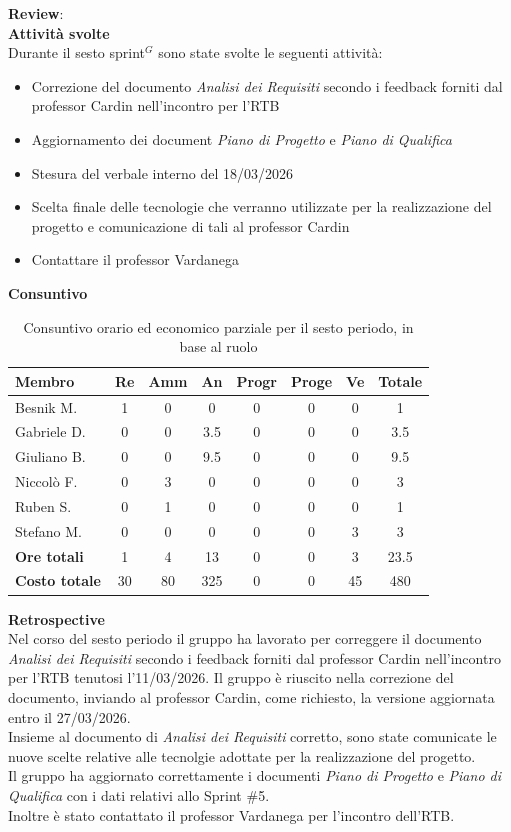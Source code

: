 \documentclass[a4paper,10pt]{article}
\begin{document}
\textbf{Review}: \\
\textbf{Attività svolte}\\
Durante il sesto sprint$^G$ sono state svolte le seguenti attività:
\begin{itemize}
  \item Correzione del documento \textit{Analisi dei Requisiti} secondo i feedback forniti dal professor Cardin nell'incontro per l'RTB
  \item Aggiornamento dei document \textit{Piano di Progetto} e \textit{Piano di Qualifica}
  \item Stesura del verbale interno del 18/03/2026
  \item Scelta finale delle tecnologie che verranno utilizzate per la realizzazione del progetto e comunicazione di tali al professor Cardin
  \item Contattare il professor Vardanega
\end{itemize}
\textbf{Consuntivo}
\begin{table}[H]
\centering
\begin{tabular}{|l|c|c|c|c|c|c|c|}
\hline
\textbf{Membro} & \textbf{Re} & \textbf{Amm} & \textbf{An} & \textbf{Progr} & \textbf{Proge} & \textbf{Ve} & \textbf{Totale} \\
\hline
Besnik M.   & 1   & 0   & 0   & 0   & 0   & 0   & 1   \\
Gabriele D. & 0   & 0 & 3.5   & 0   & 0   & 0   & 3.5 \\
Giuliano B. & 0   & 0   & 9.5   & 0   & 0   & 0 & 9.5 \\
Niccolò F.  & 0   & 3 & 0   & 0   & 0   & 0   & 3   \\
Ruben S.    & 0 & 1   & 0   & 0   & 0   & 0   & 1  \\
Stefano M.  & 0   & 0   & 0   & 0   & 0   & 3   & 3   \\
\hline
\textbf{Ore totali}   & 1 & 4   & 13   & 0  & 0  & 3 & 23.5 \\
\hline
\textbf{Costo totale} & 30  & 80 & 325 & 0  & 0  & 45 & 480 \\
\hline
\end{tabular}
\caption{Consuntivo orario ed economico parziale per il sesto periodo, in base al ruolo}
\end{table}

\textbf{Retrospective} \\
Nel corso del sesto periodo il gruppo ha lavorato per correggere il documento \textit{Analisi dei Requisiti} secondo i feedback forniti dal professor Cardin nell'incontro per l'RTB tenutosi l'11/03/2026. Il gruppo è riuscito nella correzione del documento, inviando al professor Cardin, come richiesto, la versione aggiornata entro il 27/03/2026. \\
Insieme al documento di \textit{Analisi dei Requisiti} corretto, sono state comunicate le nuove scelte relative alle tecnolgie adottate per la realizzazione del progetto. \\
Il gruppo ha aggiornato correttamente i documenti \textit{Piano di Progetto} e \textit{Piano di Qualifica} con i dati relativi allo Sprint \#5. \\
Inoltre è stato contattato il professor Vardanega per l'incontro dell'RTB.
\end{document}
